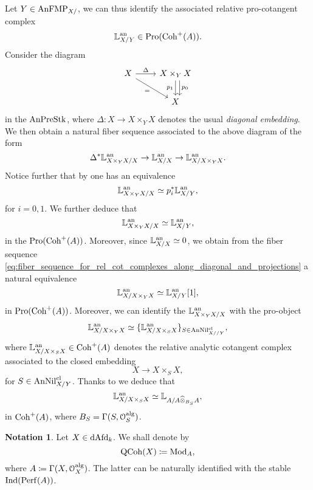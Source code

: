 \documentclass[10pt,a4paper,reqno]{amsart} %
\theoremstyle{plain}
\theoremstyle{definition}
\newtheorem{notation}[thm]{Notation}
\theoremstyle{remark}
\numberwithin{equation}{section}
\begin{document}
Let $Y \in \mathrm{AnFMP}_{X/}$, we can thus identify
the associated relative pro-cotangent complex
    \[
        \mathbb L^\mathrm{an}_{X/Y} \in \mathrm{Pro}(\mathrm{Coh}^+(A)).  
    \]
Consider the diagram
    \[
    \begin{tikzcd}
        X \ar{r}{\Delta}  \ar{rd}[swap]{=} & X \times_Y X \arrow[d, "p_0", shift left=2] \arrow{d}[swap]{p_1} \\
        &   X  
    \end{tikzcd}
    \]
in the \infcat $\mathrm{AnPreStk}$, where $\Delta \colon X \to X \times_Y X$ denotes the usual \emph{diagonal embedding}. We then obtain a natural
fiber sequence associated to the above diagram of the form
    \begin{equation} \label{eq:fiber_sequence_for_rel_cot_complexes_along_diagonal_and_projections}
        \Delta^* \mathbb L^\mathrm{an}_{X \times_Y X/ X} \to \mathbb L^\mathrm{an}_{X/X} \to \mathbb L^\mathrm{an}_{X/ X \times_Y X}.
    \end{equation}
Notice further that by \cite[Proposition 5.12]{Porta_Yu_Representability} one has an equivalence
    \[
        \mathbb L^\mathrm{an}_{X \times_Y X/ X} \simeq p_i^* \mathbb L^\mathrm{an}_{X/Y},  
    \]
for $i =0, 1$. We further deduce that
    \[\mathbb L^\mathrm{an}_{X \times_Y X/ X} \simeq \mathbb L^\mathrm{an}_{X/Y},\]
in the \infcat $\mathrm{Pro}(\mathrm{Coh}^+(A))$. Moreover, since $\mathbb L^\mathrm{an}_{X/ X} \simeq 0$, we obtain from the fiber sequence \eqref{eq:fiber_sequence_for_rel_cot_complexes_along_diagonal_and_projections}
a natural equivalence
    \[
        \mathbb L^\mathrm{an}_{X/ X \times_Y X} \simeq \mathbb L^\mathrm{an}_{X / Y} [1],    
    \]
in $\mathrm{Pro}(\mathrm{Coh}^+(A))$. Moreover, we can identify the $\mathbb L^\mathrm{an}_{X \times_Y X / X}$ with the pro-object  
    \[
        \mathbb L^\mathrm{an}_{X/ X \times_Y X } \simeq \{ \mathbb L^\mathrm{an}_{X/ X \times_S X} \}_{S \in \mathrm{AnNil}_{X//Y}^{\mathrm{cl}}} ,
    \]
where $\mathbb L^\mathrm{an}_{X/ X\times_S X} \in \mathrm{Coh}^+(A)$ denotes the relative analytic cotangent complex associated to the closed embedding
    \[
        X \to X \times_S X,  
    \]
for $S \in \mathrm{AnNil}_{X/Y}^{\mathrm{cl}}$. Thanks to \cite[Corollary 5.33]{Porta_Yu_Representability} we deduce that
    \[
        \mathbb L^\mathrm{an}_{X/X\times_SX} \simeq \mathbb L_{A/ A \widehat{\otimes}_{B_S} A} ,
    \]
in $\mathrm{Coh}^+(A)$, where $B_S = \Gamma(S, \mathcal O^\mathrm{alg}_S)$. 

\begin{notation}
    Let $X \in \mathrm{dAfd}_k$. We shall denote by
        \[
            \mathrm{QCoh}(X) \coloneqq \mathrm{Mod}_A,  
        \]
    where $A \coloneqq \Gamma(X, \mathcal O_X^\mathrm{alg})$. The latter can be naturally identified with the stable \infcat $\mathrm{Ind}(\mathrm{Perf}(A))$.
\end{notation}
\end{document}
